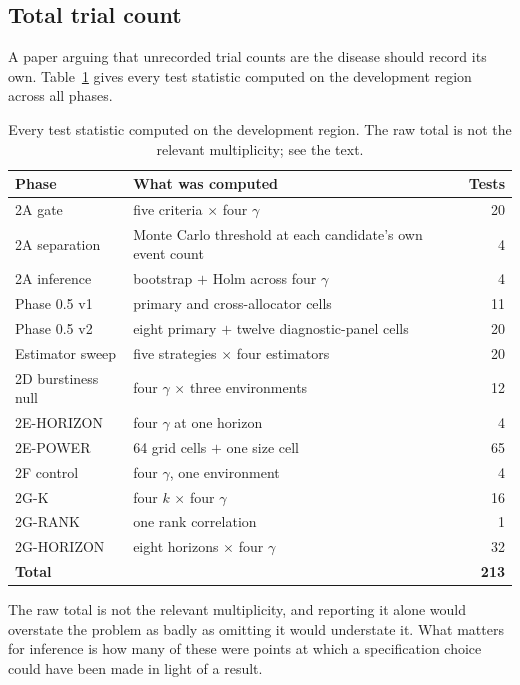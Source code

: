 \documentclass[12pt,letterpaper]{article}
\begin{document}
\subsection{Total trial count}
\label{sec:trials}

A paper arguing that unrecorded trial counts are the disease should record its own.
Table~\ref{tab:trials} gives every test statistic computed on the development region
across all phases.

\begin{table}[htbp]
\centering
\caption{Every test statistic computed on the development region. The raw total is not
the relevant multiplicity; see the text.}
\label{tab:trials}
\small
\begin{tabular}{llr}
\toprule
Phase & What was computed & Tests \\
\midrule
2A gate            & five criteria $\times$ four $\gamma$ & 20 \\
2A separation      & Monte Carlo threshold at each candidate's own event count & 4 \\
2A inference       & bootstrap $+$ Holm across four $\gamma$ & 4 \\
Phase 0.5 v1       & primary and cross-allocator cells & 11 \\
Phase 0.5 v2       & eight primary $+$ twelve diagnostic-panel cells & 20 \\
Estimator sweep    & five strategies $\times$ four estimators & 20 \\
2D burstiness null & four $\gamma$ $\times$ three environments & 12 \\
2E-HORIZON         & four $\gamma$ at one horizon & 4 \\
2E-POWER           & 64 grid cells $+$ one size cell & 65 \\
2F control         & four $\gamma$, one environment & 4 \\
2G-K               & four $k$ $\times$ four $\gamma$ & 16 \\
2G-RANK            & one rank correlation & 1 \\
2G-HORIZON         & eight horizons $\times$ four $\gamma$ & 32 \\
\midrule
\textbf{Total}     &  & \textbf{213} \\
\bottomrule
\end{tabular}
\end{table}

The raw total is not the relevant multiplicity, and reporting it alone would overstate
the problem as badly as omitting it would understate it. What matters for inference is
how many of these were points at which a specification choice could have been made in
light of a result.
\end{document}
